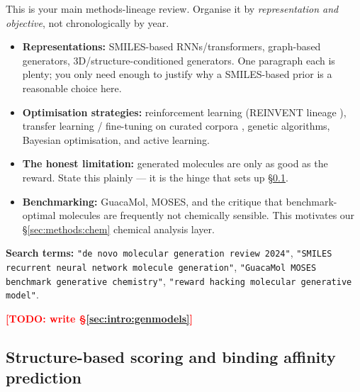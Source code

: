 \documentclass[11pt]{article}
\newcommand{\TODO}[1]{\textcolor{red}{\textbf{[TODO: #1]}}}
\begin{document}
\begin{yourturn}
This is your main methods-lineage review. Organise it by \emph{representation
and objective}, not chronologically by year.
\begin{itemize}\itemsep0pt
  \item \textbf{Representations:} SMILES-based RNNs/transformers, graph-based
        generators, 3D/structure-conditioned generators. One paragraph each is
        plenty; you only need enough to justify why a SMILES-based prior is a
        reasonable choice here.
  \item \textbf{Optimisation strategies:} reinforcement learning
        (REINVENT lineage \citep{olivecrona2017, blaschke2020, loeffler2024}),
        transfer learning / fine-tuning on curated corpora
        \citep{segler2018}, genetic algorithms, Bayesian optimisation,
        and active learning.
  \item \textbf{The honest limitation:} generated molecules are only as good as
        the reward. State this plainly --- it is the hinge that sets up
        \S\ref{sec:intro:scoring}.
  \item \textbf{Benchmarking:} GuacaMol, MOSES, and the critique that
        benchmark-optimal molecules are frequently not chemically sensible.
        This motivates our \S\ref{sec:methods:chem} chemical analysis layer.
\end{itemize}
\textbf{Search terms:} \texttt{"de novo molecular generation review 2024"},
\texttt{"SMILES recurrent neural network molecule generation"},
\texttt{"GuacaMol MOSES benchmark generative chemistry"},
\texttt{"reward hacking molecular generative model"}.
\end{yourturn}

\TODO{write \S\ref{sec:intro:genmodels}}

\subsection{Structure-based scoring and binding affinity prediction}
\label{sec:intro:scoring}
\end{document}

